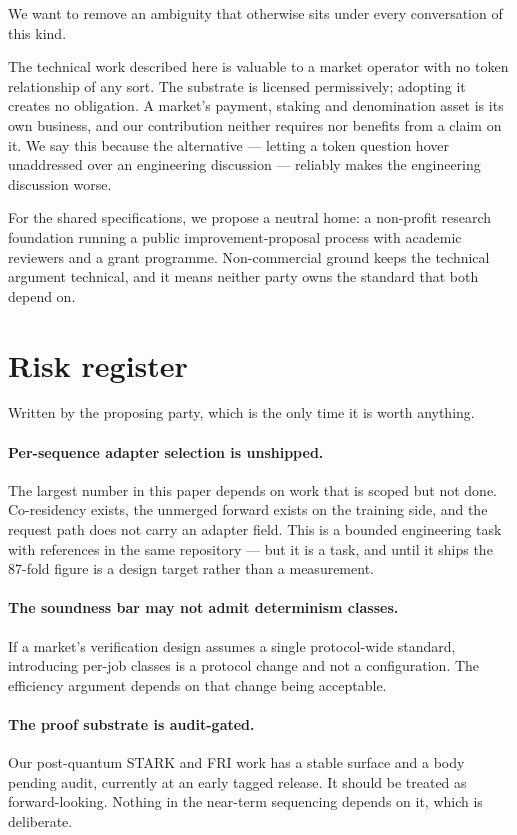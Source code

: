 \documentclass[11pt,a4paper]{article}
\begin{document}
We want to remove an ambiguity that otherwise sits under every conversation of
this kind.

The technical work described here is valuable to a market operator with no token
relationship of any sort. The substrate is licensed permissively; adopting it
creates no obligation. A market's payment, staking and denomination asset is its
own business, and our contribution neither requires nor benefits from a claim on
it. We say this because the alternative --- letting a token question hover
unaddressed over an engineering discussion --- reliably makes the engineering
discussion worse.

For the shared specifications, we propose a neutral home: a non-profit research
foundation running a public improvement-proposal process with academic reviewers
and a grant programme. Non-commercial ground keeps the technical argument
technical, and it means neither party owns the standard that both depend on.

\section{Risk register}

Written by the proposing party, which is the only time it is worth anything.

\paragraph{Per-sequence adapter selection is unshipped.} The largest number in
this paper depends on work that is scoped but not done. Co-residency exists, the
unmerged forward exists on the training side, and the request path does not carry
an adapter field. This is a bounded engineering task with references in the same
repository --- but it is a task, and until it ships the \num{87}-fold figure is a
design target rather than a measurement.

\paragraph{The soundness bar may not admit determinism classes.} If a market's
verification design assumes a single protocol-wide standard, introducing
per-job classes is a protocol change and not a configuration. The efficiency
argument depends on that change being acceptable.

\paragraph{The proof substrate is audit-gated.} Our post-quantum STARK and FRI
work has a stable surface and a body pending audit, currently at an early tagged
release. It should be treated as forward-looking. Nothing in the near-term
sequencing depends on it, which is deliberate.
\end{document}
